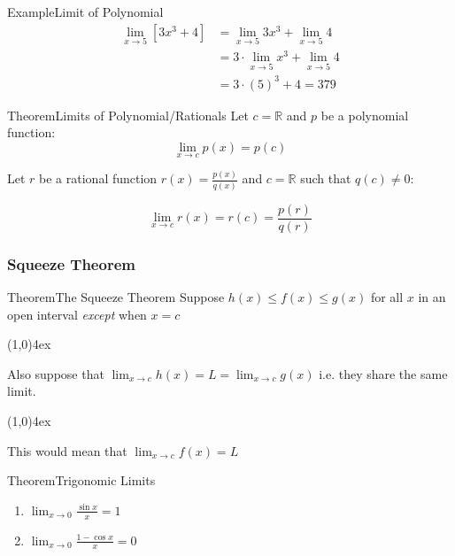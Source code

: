 \documentclass{MathNotes}
\newenvironment{example}[1]{\begin{BlueBox}{Example}{#1}}{\end{BlueBox}}
\newenvironment{theorem}[1]{\begin{GrayBox}{Theorem}{#1}}{\end{GrayBox}}
\newcommand{\br}{
	\begin{center}
		\line(1,0){4ex}
	\end{center}}
\begin{document}
\begin{example}{Limit of Polynomial}
	\begin{align*}
		\lim_{x\to 5}[ 3x^3+4 ] & = \lim_{x\to 5} 3x^3 + \lim_{x\to 5}4       \\
		                        & = 3 \cdot \lim_{x\to 5}x^3 + \lim_{x\to 5}4 \\
		                        & = 3 \cdot (5)^3 + 4=379
	\end{align*}
\end{example}

\begin{theorem}{Limits of Polynomial/Rationals}
	Let $c=\mathbb{R}$ and $p$ be a polynomial function:
	\begin{displaymath}
		\lim_{x\to c}p(x)=p(c)
	\end{displaymath}

	Let $r$ be a rational function $r(x)=\frac{p(x)}{q(x)}$ and $c=\mathbb{R}$
	such that $q(c)\neq 0$:

	\begin{displaymath}
		\lim_{x\to c}r(x)=r(c)=\frac{p(r)}{q(r)}
	\end{displaymath}
\end{theorem}

\newpage
\subsubsection{Squeeze Theorem}\label{sec:1.2.2}

\begin{multicols}{2}[]
	\begin{theorem}{The Squeeze Theorem}
		Suppose $h(x)\leq f(x) \leq g(x)$ for all $x$ in an open interval
		\textit{except} when $x=c$
		\br

		Also suppose that $\displaystyle\lim_{x\to c}h(x)=L=\lim_{x\to c}g(x)$ i.e. they share
		the same limit.
		\br

		This would mean that $\lim_{x\to c}f(x)=L$
	\end{theorem}

	\begin{theorem}{Trigonomic Limits}
		\begin{enumerate}
			\item $\displaystyle\lim_{x\to 0}\frac{\sin x}{x} = 1$
			\item $\displaystyle\lim_{x\to 0}\frac{1 - \cos x}{x} = 0$
		\end{enumerate}
	\end{theorem}

	\centering
	
\end{multicols}
\end{document}
